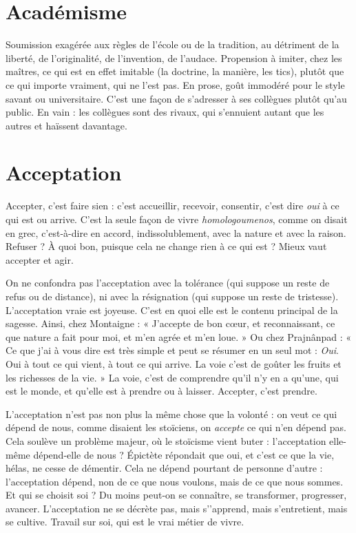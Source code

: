 \section{Académisme}
Soumission exagérée aux règles de l’école ou de la tradition,
au détriment de la liberté, de l’originalité, de l’invention,
de l’audace. Propension à imiter, chez les maîtres, ce qui est en effet imitable
(la doctrine, la manière, les tics), plutôt que ce qui importe vraiment, qui
ne l’est pas. En prose, goût immodéré pour le style savant ou universitaire.
C’est une façon de s'adresser à ses collègues plutôt qu’au public. En vain : les
collègues sont des rivaux, qui s’ennuient autant que les autres et haïssent davantage.

\section{Acceptation}
Accepter, c’est faire sien : c’est accueillir, recevoir, consentir,
c’est dire {\it oui} à ce qui est ou arrive. C’est la seule façon
de vivre {\it homologoumenos}, comme on disait en grec, c’est-à-dire en accord,
indissolublement, avec la nature et avec la raison. Refuser ? À quoi bon,
puisque cela ne change rien à ce qui est ? Mieux vaut accepter et agir.

On ne confondra pas l’acceptation avec la tolérance (qui suppose un reste
de refus ou de distance), ni avec la résignation (qui suppose un reste de tristesse).
L’acceptation vraie est joyeuse. C’est en quoi elle est le contenu principal
de la sagesse. Ainsi, chez Montaigne : « J’accepte de bon cœur, et reconnaissant,
ce que nature a fait pour moi, et m'en agrée et m’en loue. » Ou chez
Prajnânpad : « Ce que j'ai à vous dire est très simple et peut se résumer en un
seul mot : {\it Oui}. Oui à tout ce qui vient, à tout ce qui arrive. La voie c’est de
goûter les fruits et les richesses de la vie. » La voie, c’est de comprendre qu’il
n'y en a qu’une, qui est le monde, et qu’elle est à prendre ou à laisser. Accepter,
c’est prendre.

L’acceptation n’est pas non plus la même chose que la volonté : on veut ce
qui dépend de nous, comme disaient les stoïciens, on {\it accepte} ce qui n’en
dépend pas. Cela soulève un problème majeur, où le stoïcisme vient buter :
l'acceptation elle-même dépend-elle de nous ? Épictète répondait que oui, et
c'est ce que la vie, hélas, ne cesse de démentir. Cela ne dépend pourtant de personne
d’autre : l’acceptation dépend, non de ce que nous voulons, mais de ce
que nous sommes. Et qui se choisit soi ? Du moins peut-on se connaître, se
transformer, progresser, avancer. L’acceptation ne se décrète pas, mais
s’'apprend, mais s’entretient, mais se cultive. Travail sur soi, qui est le vrai
métier de vivre.

